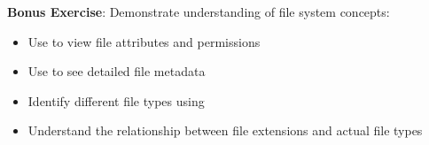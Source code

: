 \textbf{Bonus Exercise}: Demonstrate understanding of file system concepts:
\begin{itemize}
    \item Use  to view file attributes and permissions
    \item Use  to see detailed file metadata
    \item Identify different file types using 
    \item Understand the relationship between file extensions and actual file types
\end{itemize}
